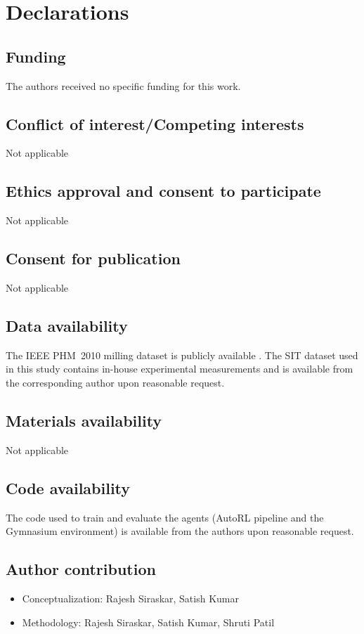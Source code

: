 \documentclass[sn-basic]{sn-jnl} %
\begin{document}
\section*{Declarations}

\subsection*{Funding}
The authors received no specific funding for this work.

\subsection*{Conflict of interest/Competing interests}
Not applicable

\subsection*{Ethics approval and consent to participate}
Not applicable

\subsection*{Consent for publication}
Not applicable

\subsection*{Data availability}
The IEEE PHM~2010 milling dataset is publicly available \cite{PHMdata2010}. The SIT dataset used in this study contains in-house experimental measurements and is available from the corresponding author upon reasonable request.

\subsection*{Materials availability}
Not applicable

\subsection*{Code availability}
The code used to train and evaluate the agents (AutoRL pipeline and the Gymnasium environment) is available from the authors upon reasonable request.

\subsection*{Author contribution}
\begin{itemize}
		\item Conceptualization: Rajesh Siraskar, Satish Kumar
		\item Methodology: Rajesh Siraskar, Satish Kumar, Shruti Patil
\end{itemize}
\end{document}
